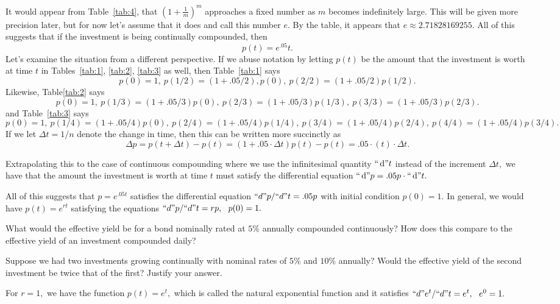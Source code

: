 It would appear from Table~\ref{tab:4}, that $(1+\frac{1}{m})^m$ approaches a fixed number
as $m$ becomes indefinitely large.  This will be given more precision
later, but for now let’s assume that it does and call this number $e.$ 
By the table, it appears that $e\approx{}2.71828169255.$  All of this suggests
that if the investment is being continually compounded, then
$$
p(t)=e^.05t.
$$
Let’s examine the situation from a different perspective. If we abuse
notation by letting $p(t)$ be the amount that the investment is worth
at time $t$ in Tables~\ref{tab:1}, \ref{tab:2}, \ref{tab:3} as well,
then Table~\ref{tab:1} says
$$
p(0)=1,\ p(1/2)=(1+.05/2),p(0), \ p(2/2)=(1+.05/2)p(1/2).
$$
Likewise, Table\ref{tab:2} says 
$$
p(0)=1,\ p(1/3)=(1+.05/3)p(0),\ p(2/3)=(1+.05/3)p(1/3),\ p(3/3)=(1+.05/3)p(2/3). 
$$
and Table~\ref{tab:3} says 
$$
p(0)=1,\ p(1/4)=(1+.05/4)p(0),\ p(2/4)=(1+.05/4)p(1/4),\ p(3/4)=(1+.05/4)p(2/4),\ p(4/4)=(1+.05/4)p(3/4).  
$$
If we let $\Delta t=1/n$ denote the change in time, then this can be
written more succinctly as 
$$
\Delta p=p(t+Δt)-p(t)=(1+.05\cdot\Delta
t)p(t)-p(t)=.05\cdotp(t)\cdot\Delta t.
$$

Extrapolating this to the case of continuous compounding where we use
the infinitesimal quantity $``\thinspace{\rm d}" t$ instead of the increment $\Delta t,$ we have
that the amount the investment is worth at time $t$ must satisfy the
differential equation $``\thinspace{\rm d}" p=.05p\cdot ``\thinspace{\rm d}" t.$

All of this suggests that $p=e^{.05t}$ satisfies the differential
equation $``d" p/``d" t=.05p$ with initial condition $p(0)=1.$  In
general, we would have $p(t)=e^{rt}$ satisfying the equations $``d" p/``d"
t=rp,\ \ p(0)=1.$

\begin{embeddedproblem}{}
  What would the effective yield be for a bond nominally rated at
  $5\%$ annually compounded continuously?  How does this compare to
  the effective yield of an investment compounded daily?
\end{embeddedproblem}

\begin{embeddedproblem}{}
  Suppose we had two investments growing continually with nominal
  rates of $5\%$ and $10\%$ annually?  Would the effective yield of
  the second investment be twice that of the first?  Justify your
  answer.
\end{embeddedproblem}

For $r=1,$ we have the function $p(t)=e^t,$ which is called the
natural exponential function and it satisfies $``d" e^t /``d" t=e^t,\
\ e^0=1.$

